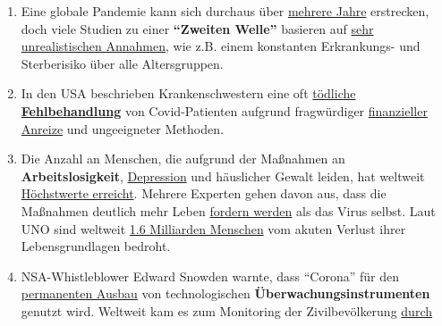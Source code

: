\begin{enumerate}
{  Schäden} und Klagen in Millionenhöhe. Auch bei Tests von
  Corona-Impfstoffen
  \href{https://www.forbes.com/sites/williamhaseltine/2020/05/16/did-the-oxford-covid-vaccine-work-in-monkeys-not-really/}{kam
  es bereits} zu gravierenden
  \href{https://childrenshealthdefense.org/news/vaccine-trial-catastrophe-moderna-vaccine-has-20-serious-injury-rate-in-high-dose-group/}{Komplikationen}.
\item
  Eine globale Pandemie kann sich durchaus über
  \href{https://www.britannica.com/event/1968-flu-pandemic}{mehrere
  Jahre} erstrecken, doch viele Studien zu einer \textbf{``Zweiten
  Welle''} basieren auf
  \href{https://www.heise.de/tp/features/Fellay-Studie-Zweite-Corona-Welle-4726303.html}{sehr
  unrealistischen Annahmen}, wie z.B. einem konstanten Erkrankungs- und
  Sterberisiko über alle Altersgruppen.
\item
  In den USA beschrieben Krankenschwestern eine oft
  \href{https://www.youtube.com/watch?v=UIDsKdeFOmQ}{tödliche
  \textbf{Fehlbehandlung}} von Covid-Patienten aufgrund fragwürdiger
  \href{https://www.usatoday.com/story/news/factcheck/2020/04/24/fact-check-medicare-hospitals-paid-more-covid-19-patients-coronavirus/3000638001/}{finanzieller
  Anreize} und ungeeigneter Methoden.
\item
  Die Anzahl an Menschen, die aufgrund der Maßnahmen an
  \textbf{Arbeitslosigkeit},
  \href{https://www.indystar.com/story/news/health/2020/04/03/coronavirus-indiana-how-get-help-mental-health-addiction/5104357002/}{Depression}
  und häuslicher Gewalt leiden, hat weltweit
  \href{https://www.businessinsider.com/us-weekly-jobless-claims-unemployment-filings-coronavirus-labor-market-layoffs-2020-5}{Höchstwerte
  erreicht}. Mehrere Experten gehen davon aus, dass die Maßnahmen
  deutlich mehr Leben
  \href{https://www.nytimes.com/2020/03/20/opinion/coronavirus-pandemic-social-distancing.html}{fordern
  werden} als das Virus selbst. Laut UNO sind weltweit
  \href{https://www.theguardian.com/world/2020/apr/29/half-of-worlds-workers-at-immediate-risk-of-losing-livelihood-due-to-coronavirus}{1.6
  Milliarden Menschen} vom akuten Verlust ihrer Lebens­grund­lagen
  bedroht.
\item
  NSA-Whistleblower Edward Snowden warnte, dass ``Corona'' für den
  \href{https://www.youtube.com/watch?v=-pcQFTzck_c}{permanenten Ausbau}
  von technologischen \textbf{Überwachungs­instrumenten} genutzt wird.
  Weltweit kam es zum Monitoring der Zivilbevölkerung
  \href{https://off-guardian.org/2020/04/25/50-headlines-darker-more-of-the-new-normal/}{durch
}
\end{enumerate}
